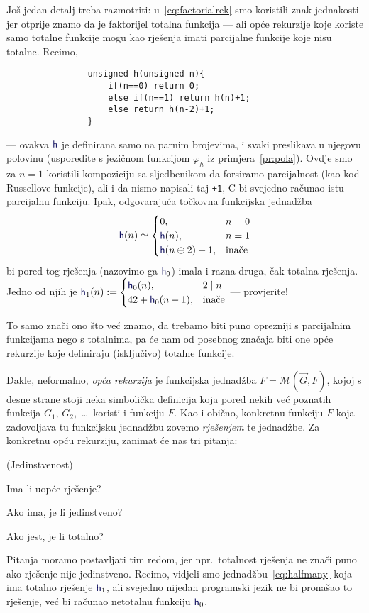Još jedan detalj treba razmotriti: u~\eqref{eq:factorialrek} smo koristili znak jednakosti jer otprije znamo da je faktorijel totalna funkcija --- ali opće rekurzije koje koriste samo totalne funkcije mogu kao rješenja imati parcijalne funkcije koje nisu totalne. Recimo,
\begin{verbatim}
                unsigned h(unsigned n){
                    if(n==0) return 0;
                    else if(n==1) return h(n)+1;
                    else return h(n-2)+1;
                }
\end{verbatim}
--- ovakva $\f h$ je definirana samo na parnim  brojevima, i svaki preslikava u njegovu polovinu (usporedite s jezičnom funkcijom $\varphi_h$ iz primjera~\ref{pr:pola}). Ovdje smo za $n=1$ koristili kompoziciju sa sljedbenikom da forsiramo parcijalnost (kao kod Russellove funkcije), ali i da nismo napisali taj \texttt{+1}, C bi svejedno računao istu parcijalnu funkciju. Ipak, odgovarajuća točkovna funkcijska jednadžba
\begin{equation}\label{eq:halfmany}
    \f h(n)\simeq\begin{cases}
        0,&n=0\\
        \f h(n),&n=1\\
        \f h(n\ominus2)+1,&\text{inače}
    \end{cases}
\end{equation}
bi pored tog rješenja (nazovimo ga $\f h_0$) imala i razna druga, čak totalna rješenja. Jedno od njih je
$
    \f h_1(n):=\begin{cases}
        \f h_0(n),&2\mid n\\
        42+\f h_0(n-1),&\text{inače}
    \end{cases}
$ --- provjerite!

To samo znači ono što već znamo, da trebamo biti puno oprezniji s parcijalnim funkcijama nego s totalnima, pa će nam od posebnog značaja biti one opće rekurzije koje definiraju (isključivo) totalne funkcije.

Dakle, neformalno, \emph{opća rekurzija} je funkcijska jednadžba $F=\mathcal M(\vec G,F)$, kojoj s desne strane stoji neka simbolička definicija koja pored nekih već poznatih funkcija $G_1$, $G_2$,~\ldots\ koristi i funkciju $F$. Kao i obično, konkretnu funkciju $F$ koja zadovoljava tu funkcijsku jednadžbu zovemo \emph{rješenjem} te jednadžbe. Za konkretnu opću rekurziju, zanimat će nas tri pitanja:
\begin{labeling}{(Jedinstvenost)}
    \item[(Egzistencija)] Ima li uopće rješenje?
    \item[(Jedinstvenost)] Ako ima, je li jedinstveno?
    \item[(Totalnost)] Ako jest, je li totalno?
\end{labeling}
Pitanja moramo postavljati tim redom, jer npr.\ totalnost rješenja ne znači puno ako rješenje nije jedinstveno. Recimo, vidjeli smo jednadžbu~\eqref{eq:halfmany} koja ima totalno rješenje $\f h_1$, ali svejedno nijedan programski jezik ne bi pronašao to rješenje, već bi računao netotalnu funkciju $\f h_0$.

